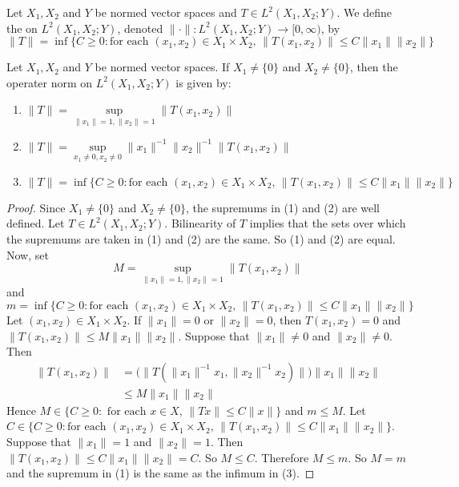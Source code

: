 \documentclass{book}
\begin{document}
	\begin{defn} 
	Let $X_1, X_2$ and $Y$ be normed vector spaces and $T \in L^2(X_1, X_2;Y)$. We define the  on $L^2(X_1, X_2;Y)$, denoted $\|\cdot\|: L^2(X_1, X_2; Y) \rightarrow [0, \infty)$, by  $$\|T\| =  \inf \{C \geq 0: \text{for each } (x_1, x_2) \in X_1 \times X_2\text{, } \|T(x_1, x_2) \|\leq C\|x_1\|\|x_2\|\}$$
	\end{defn}
	
	\begin{ex} 
		Let $X_1, X_2$ and $Y$ be normed vector spaces. If $X_1 \neq \{0\}$ and $ X_2 \neq \{0\}$, then the operater norm on $L^2(X_1, X_2; Y)$ is given by: 
		\begin{enumerate}
			\item $\|T\| = \sup\limits_{\|x_1\|=1 ,\|x_2\| = 1 }\|T(x_1, x_2)\|$
			\item $\|T\| = \sup\limits_{x_1 \neq 0, x_2 \neq 0 } \|x_1\|^{-1} \|x_2\|^{-1}\|T(x_1, x_2)\|$
			\item $\|T\| = \inf \{C \geq 0: \text{for each } (x_1, x_2) \in X_1 \times X_2\text{, } \|T(x_1, x_2) \|\leq C\|x_1\|\|x_2\|\}$
		\end{enumerate}
	\end{ex}
	
	\begin{proof} Since $X_1 \neq \{0\}$ and $ X_2 \neq \{0\}$, the supremums in (1) and (2) are well defined. Let $T \in L^2(X_1, X_2; Y)$. Bilinearity of $T$ implies that the sets over which the supremums are taken in (1) and (2) are the same. So (1) and (2) are equal.\\
		Now, set 
		$$M = \sup\limits_{\|x_1\|=1 ,\|x_2\| = 1 }\|T(x_1, x_2)\|$$ 
		and 
		$$m = \inf \{C \geq 0: \text{for each } (x_1, x_2) \in X_1 \times X_2\text{, } \|T(x_1, x_2) \|\leq C\|x_1\|\|x_2\|\}$$ 
		Let $(x_1,x_2) \in X_1 \times X_2$. If $\|x_1 \|=0$ or $\|x_2 \|=0$, then $T(x_1, x_2) = 0$ and $\|T(x_1, x_2) \|\leq M \|x_1 \| \|x_2\|$. Suppose that $\|x_1 \| \neq 0$ and $ \|x_2\|\neq 0$. Then 
		\begin{align*}
			\|T(x_1, x_2)\|
			&= \bigg(\big\|T(\|x_1\|^{-1} x_1, \|x_2\|^{-1} x_2 )\big\|\bigg)\|x_1 \| \|x_2\|\\
			& \leq M \|x_1\| \|x_2\|
		\end{align*}
		Hence $M \in \{C \geq 0: \text{ for each }x \in X\text{, } \|Tx \|\leq C \|x \|\}$ and $m \leq M$.
		Let $C \in \{C \geq 0: \text{for each } (x_1, x_2) \in X_1 \times X_2\text{, } \|T(x_1, x_2) \|\leq C\|x_1\|\|x_2\|\}$. Suppose that $\|x_1 \|=1$ and $\|x_2\| = 1$. Then $\| T (x_1, x_2) \| \leq C \|x_1 \| \|x_2 \|= C$. So $M \leq C$. Therefore $M \leq m$. So $M=m$ and the supremum in (1) is the same as the infimum in (3). 
	\end{proof}
\end{document}
